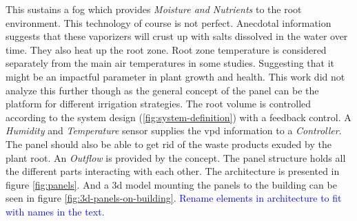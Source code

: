 This sustains a fog which provides \textit{Moisture and Nutrients} to the root environment.
This technology of course is not perfect.
Anecdotal information suggests that these vaporizers will crust up with salts dissolved in the water over time.
They also heat up the root zone.
Root zone temperature is considered separately from the main air temperatures in some studies.
Suggesting that it might be an impactful parameter in plant growth and health.
This work did not analyze this further though as the general concept of the panel can be the platform for different irrigation strategies.
The root volume is controlled according to the system design (\ref{fig:system-definition}) with a feedback control.
A \textit{Humidity} and \textit{Temperature} sensor supplies the \ac{vpd} information to a \textit{Controller}.
The panel should also be able to get rid of the waste products exuded by the plant root.
An \textit{Outflow} is provided by the concept.
The panel structure holds all the different parts interacting with each other.
The architecture is presented in figure \ref{fig:panels}. 
And a 3d model mounting the panels to the building can be seen in figure \ref{fig:3d-panels-on-building}.
\textcolor{Blue}{Rename elements in architecture to fit with names in the text.}

